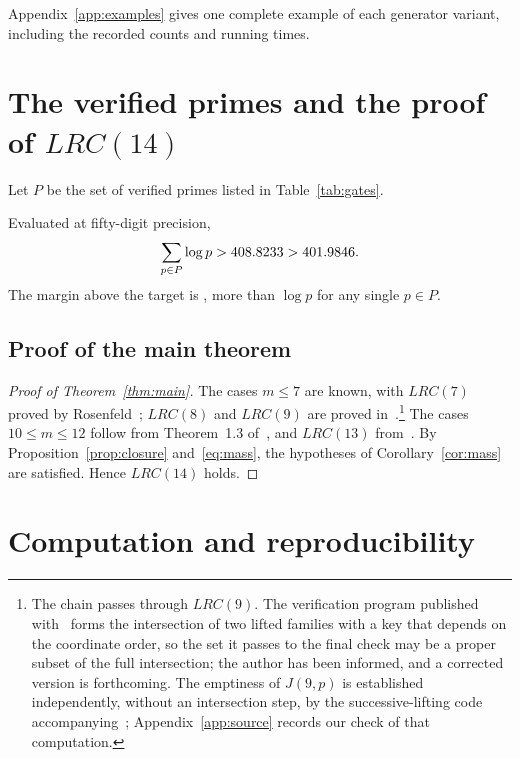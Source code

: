 \documentclass[11pt]{article}
\theoremstyle{definition}
\theoremstyle{remark}
\newcommand{\TargetUB}{401.9846}          %
\begin{document}
Appendix~\ref{app:examples} gives one complete example of each generator
variant, including the recorded counts and running times.

\section{The verified primes and the proof of \texorpdfstring{$LRC(14)$}{LRC(14)}}\label{sec:gateset}

Let $P$ be the set of \GateCount{} verified primes listed in
Table~\ref{tab:gates}.



Evaluated at fifty-digit precision,
\begin{equation}\label{eq:mass}
  \sum_{p\in P}\log p>\GateMassLB>\TargetUB .
\end{equation}
The margin above the target is \MassMargin{},
more than $\log p$ for any single $p\in P$.

\subsection{Proof of the main theorem}

\begin{proof}[Proof of Theorem~\ref{thm:main}]
The cases $m\leq7$ are known, with $LRC(7)$ proved by
Rosenfeld~\cite{Rosenfeld25}; $LRC(8)$ and $LRC(9)$ are proved
in~\cite{Trakulthongchai26}.\footnote{The chain passes through $LRC(9)$.
The verification program published with~\cite{Trakulthongchai26} forms
the intersection of two lifted families with a key that depends on the
coordinate order, so the set it passes to the final check may be a proper
subset of the full intersection; the author has been informed, and a
corrected version is forthcoming.  The emptiness of $J(9,p)$ is
established independently, without an intersection step, by the
successive-lifting code accompanying~\cite{ST26};
Appendix~\ref{app:source} records our check of that computation.}  The
cases $10\leq m\leq12$ follow from Theorem~1.3 of~\cite{ST26}, and
$LRC(13)$ from~\cite{Allikvere26}.  By
Proposition~\ref{prop:closure} and~\eqref{eq:mass}, the hypotheses of
Corollary~\ref{cor:mass} are satisfied.  Hence $LRC(14)$ holds.
\end{proof}

\section{Computation and reproducibility}
\end{document}
